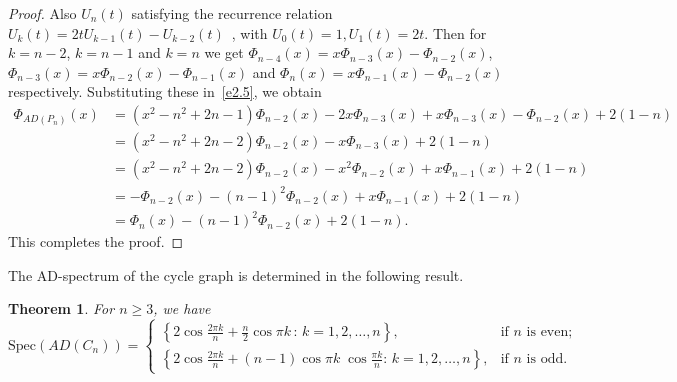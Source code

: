 \documentclass[12pt]{article}
\numberwithin{equation}{section}
\newtheorem{thm}{Theorem}[section]
\begin{document}
\begin{proof}
		Also $U_n(t)$ satisfying the recurrence relation $U_{k}(t)=2tU_{k-1}(t)-U_{k-2}(t)$~\cite[Eqns. 1.6a, 1.6b]{mason2002chebyshev}, with $U_0(t)=1, U_1(t)=2t$. Then for $k=n-2$, $k=n-1$ and $k=n$ we get $\Phi_{n-4}(x)=x\Phi_{n-3}(x)-\Phi_{n-2}(x)$, $\Phi_{n-3}(x)=x\Phi_{n-2}(x)-\Phi_{n-1}(x)$ and $\Phi_{n}(x)=x\Phi_{n-1}(x)-\Phi_{n-2}(x)$ respectively. Substituting these in~\eqref{e2.5}, we obtain
		\begin{align}
			\Phi_{AD(P_n)}(x)&=\left(x^2-n^2+2n-1\right) \Phi_{n-2}(x) - 2x \Phi_{n-3}(x)+x\Phi_{n-3}(x)-\Phi_{n-2}(x)+2(1-n) \nonumber\\
			&=\left(x^2-n^2+2n-2\right) \Phi_{n-2}(x) - x \Phi_{n-3}(x)+2(1-n)\nonumber\\
			&=\left(x^2-n^2+2n-2\right) \Phi_{n-2}(x) - x^2 \Phi_{n-2}(x)+x\Phi_{n-1}(x)+2(1-n)\nonumber\\
			&=-\Phi_{n-2}(x) -(n-1)^2\Phi_{n-2}(x)+x\Phi_{n-1}(x)+2(1-n)\nonumber\\
			&=\Phi_{n}(x) -(n-1)^2\Phi_{n-2}(x)+2(1-n).\nonumber
		\end{align}
		This completes the proof.
	\end{proof} 
 The AD-spectrum of the cycle graph is determined in the following result.
	\begin{thm}
		For $n\geq 3$, we have
		\[
		\mbox{Spec}(AD(C_n)) =
		\begin{cases}
		\left\{ 2 \cos \frac{2 \pi k}{n}+ \frac{n}{2} \cos \pi k   \,:\, k = 1,2, \dots, n \right\}, & \text{if } n \text{~is even}; \\
			\left\{ 2 \cos  \frac{2 \pi k}{n} + (n-1) \cos \pi k\; \cos \frac{\pi k}{n}:\, k = 1,2, \dots, n \right\}, & \text{if } n \text{ is odd}.
		\end{cases}
		\]
	\end{thm}
\end{document}

